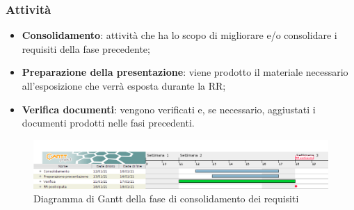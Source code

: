 \documentclass[../piano_di_progetto.tex]{subfiles}
\begin{document}
\subsubsection{Attività}
\begin{itemize}
    \item \textbf{Consolidamento}: attività che ha lo scopo di migliorare e/o consolidare i requisiti della fase precedente;
    \item \textbf{Preparazione della presentazione}: viene prodotto il materiale necessario all'esposizione che verrà esposta durante la RR;
    \item \textbf{Verifica documenti}: vengono verificati e, se necessario, aggiustati i documenti prodotti nelle fasi precedenti. 
\end{itemize}



\begin{figure}[H]
\centering
\includegraphics[width=18cm]{src/img/gantt/4_2_consolidamento_dei_requisiti.png}
\caption{ Diagramma di Gantt della fase di consolidamento dei requisiti}
\end{figure}

%
\end{document}
